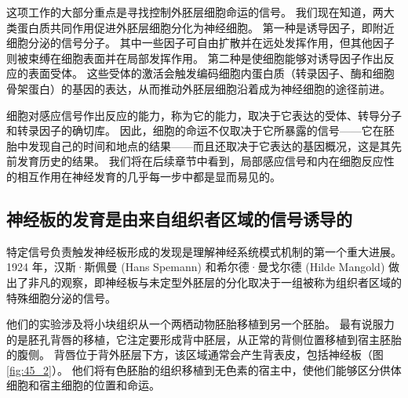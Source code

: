 这项工作的大部分重点是寻找控制外胚层细胞命运的信号。 我们现在知道，两大类蛋白质共同作用促进外胚层细胞分化为神经细胞。 第一种是诱导因子，即附近细胞分泌的信号分子。 其中一些因子可自由扩散并在远处发挥作用，但其他因子则被束缚在细胞表面并在局部发挥作用。 第二种是使细胞能够对诱导因子作出反应的表面受体。 这些受体的激活会触发编码细胞内蛋白质（转录因子、酶和细胞骨架蛋白）的基因的表达，从而推动外胚层细胞沿着成为神经细胞的途径前进。

细胞对感应信号作出反应的能力，称为它的能力，取决于它表达的受体、转导分子和转录因子的确切库。 因此，细胞的命运不仅取决于它所暴露的信号——它在胚胎中发现自己的时间和地点的结果——而且还取决于它表达的基因概况，这是其先前发育历史的结果。 我们将在后续章节中看到，局部感应信号和内在细胞反应性的相互作用在神经发育的几乎每一步中都是显而易见的。

\subsection{神经板的发育是由来自组织者区域的信号诱导的}
特定信号负责触发神经板形成的发现是理解神经系统模式机制的第一个重大进展。 1924 年，汉斯·斯佩曼 (Hans Spemann) 和希尔德·曼戈尔德 (Hilde Mangold) 做出了非凡的观察，即神经板与未定型外胚层的分化取决于一组被称为组织者区域的特殊细胞分泌的信号。


他们的实验涉及将小块组织从一个两栖动物胚胎移植到另一个胚胎。 最有说服力的是胚孔背唇的移植，它注定要形成背中胚层，从正常的背侧位置移植到宿主胚胎的腹侧。 背唇位于背外胚层下方，该区域通常会产生背表皮，包括神经板（图 \ref{fig:45_2}）。 
他们将有色胚胎的组织移植到无色素的宿主中，使他们能够区分供体细胞和宿主细胞的位置和命运。

